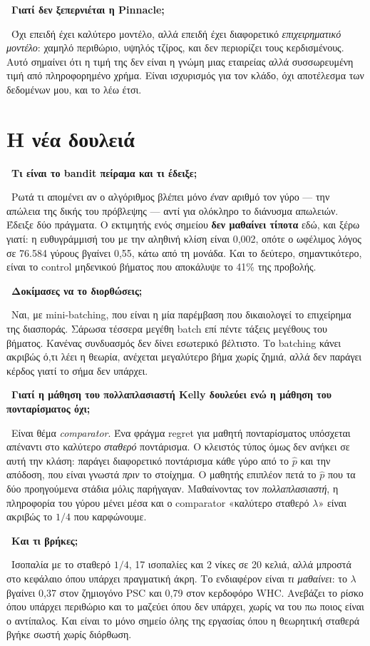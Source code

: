 \documentclass[11pt,a4paper]{article}
\newcommand{\qa}[2]{%
  \par\medskip\noindent{\color{qcol}\textbf{Ε.}}\ \textbf{#1}\par
  \noindent{\color{qcol}\textbf{Α.}}\ #2\par}
\begin{document}
\qa{Γιατί δεν ξεπερνιέται η Pinnacle;}
{Όχι επειδή έχει καλύτερο μοντέλο, αλλά επειδή έχει διαφορετικό \emph{επιχειρηματικό
μοντέλο}: χαμηλό περιθώριο, υψηλός τζίρος, και δεν περιορίζει τους κερδισμένους. Αυτό
σημαίνει ότι η τιμή της δεν είναι η γνώμη μιας εταιρείας αλλά συσσωρευμένη τιμή από
πληροφορημένο χρήμα. Είναι ισχυρισμός για τον κλάδο, όχι αποτέλεσμα των δεδομένων μου, και
το λέω έτσι.}

\section{Η νέα δουλειά}

\qa{Τι είναι το bandit πείραμα και τι έδειξε;}
{Ρωτά τι απομένει αν ο αλγόριθμος βλέπει μόνο \emph{έναν} αριθμό τον γύρο --- την απώλεια
της δικής του πρόβλεψης --- αντί για ολόκληρο το διάνυσμα απωλειών. Έδειξε δύο πράγματα. Ο
εκτιμητής ενός σημείου \textbf{δεν μαθαίνει τίποτα} εδώ, και ξέρω γιατί: η ευθυγράμμισή του
με την αληθινή κλίση είναι 0,002, οπότε ο ωφέλιμος λόγος σε 76.584 γύρους βγαίνει 0,55,
κάτω από τη μονάδα. Και το δεύτερο, σημαντικότερο, είναι το control μηδενικού βήματος που
αποκάλυψε το 41\% της προβολής.}

\qa{Δοκίμασες να το διορθώσεις;}
{Ναι, με mini-batching, που είναι η μία παρέμβαση που δικαιολογεί το επιχείρημα της
διασποράς. Σάρωσα τέσσερα μεγέθη batch επί πέντε τάξεις μεγέθους του βήματος. Κανένας
συνδυασμός δεν δίνει εσωτερικό βέλτιστο. Το batching κάνει ακριβώς ό,τι λέει η θεωρία,
ανέχεται μεγαλύτερο βήμα χωρίς ζημιά, αλλά δεν παράγει κέρδος γιατί το σήμα δεν υπάρχει.}

\qa{Γιατί η μάθηση του πολλαπλασιαστή Kelly δουλεύει ενώ η μάθηση του πονταρίσματος όχι;}
{Είναι θέμα \emph{comparator}. Ένα φράγμα regret για μαθητή πονταρίσματος υπόσχεται απέναντι
στο καλύτερο \emph{σταθερό} ποντάρισμα. Ο κλειστός τύπος όμως δεν ανήκει σε αυτή την κλάση:
παράγει διαφορετικό ποντάρισμα κάθε γύρο από το $\hat{p}$ και την απόδοση, που είναι γνωστά
\emph{πριν} το στοίχημα. Ο μαθητής επιπλέον πετά το $\hat{p}$ που τα δύο προηγούμενα στάδια
μόλις παρήγαγαν. Μαθαίνοντας τον \emph{πολλαπλασιαστή}, η πληροφορία του γύρου μένει μέσα
και ο comparator «καλύτερο σταθερό $\lambda$» είναι ακριβώς το $1/4$ που καρφώνουμε.}

\qa{Και τι βρήκες;}
{Ισοπαλία με το σταθερό $1/4$, 17 ισοπαλίες και 2 νίκες σε 20 κελιά, αλλά μπροστά στο
κεφάλαιο όπου υπάρχει πραγματική άκρη. Το ενδιαφέρον είναι \emph{τι μαθαίνει}: το $\lambda$
βγαίνει 0,37 στον ζημιογόνο PSC και 0,79 στον κερδοφόρο WHC. Ανεβάζει το ρίσκο όπου υπάρχει
περιθώριο και το μαζεύει όπου δεν υπάρχει, χωρίς να του πω ποιος είναι ο αντίπαλος. Και είναι
το μόνο σημείο όλης της εργασίας όπου η θεωρητική σταθερά βγήκε σωστή χωρίς διόρθωση.}
\end{document}
